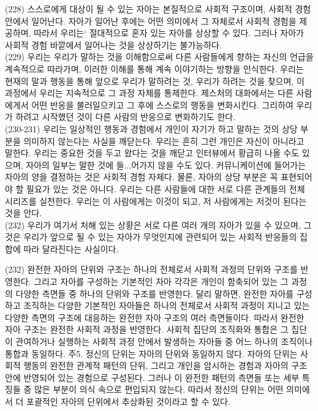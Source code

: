 \documentclass[12pt, a4paper]{article}
\begin{document}
(228) 스스로에게 대상이 될 수 있는 자아는 본질적으로 사회적 구조이며, 사회적 경험 안에서 일어난다. 자아가 일어난 후에는 어떤 의미에서 그 자체로서 사회적 경험을 제공하며, 따라서 우리는` 절대적으로 혼자 있는 자아를 상상할 수 있다. 그러나 자아가 사회적 경험 바깥에서 일어나는 것을 상상하기는 불가능하다. \\

(229) 우리는 우리가 말하는 것을 이해함으로써 다른 사람들에게 향하는 자신의 언급을 계속적으로 따라가며, 이러한 이해를 통해 계속 이야기하는 방향을 인식한다. 우리는 현재의 말과 행동을 통해 앞으로 우리가 말하려는 것, 우리가 하려는 것을 찾으며, 이 과정에서 우리는 지속적으로 그 과정 자체를 통제한다. 제스처의 대화에서는 다른 사람에게서 어떤 반응을 불러일으키고 그 후에 스스로의 행동을 변화시킨다. 그리하여 우리가 하려고 시작했던 것이 다른 사람의 반응으로 변화하기도 한다.  \\

(230-231) 우리는 일상적인 행동과 경험에서 개인이 자기가 하고 말하는 것의 상당 부분을 의미하지 않는다는 사실을 깨닫는다. 우리는 흔히 그런 개인은 자신이 아니라고 말한다. 우리는 중요한 것을 두고 왔다는 것을 깨닫고 인터뷰에서 황급히 나올 수도 있으며, 자아의 일부는 말한 것에 들...어가지 않을 수도 있다. 커뮤니케이션에 들어가는 자아의 양을 결정하는 것은 사회적 경험 자체다. 물론, 자아의 상당 부분은 꼭 표현되어야 할 필요가 있는 것은 아니다. 우리는 다른 사람들에 대한 서로 다른 관계들의 전체 시리즈를 실천한다. 우리는 이 사람에게는 이것이 되고, 저 사람에게는 저것이 된다는 것을 안다. \\

(232) 우리가 여기서 처해 있는 상황은 서로 다른 여러 개의 자아가 있을 수 있으며, 그것은 우리가 앞으로 될 수 있는 자아가 무엇인지에 관련되어 있는 사회적 반응들의 집합에 따라 달라진다는 사실이다. 

(232) 완전한 자아의 단위와 구조는 하나의 전체로서 사회적 과정의 단위와 구조를 반영한다. 그리고 자아를 구성하는 기본적인 자아 각각은 개인이 함축되어 있는 그 과정의 다양한 측면들 중 하나의 단위와 구조를 반영한다. 달리 말하면, 완전한 자아를 구성하고 조직하는 다양한 기본적인 자아들은 하나의 전체로서 사회적 과정이 지니고 있는 다양한 측면의 구조에 대응하는 완전한 자아 구조의 여러 측면들이다. 따라서 완전한 자아 구조는 완전한 사회적 과정을 반영한다. 사회적 집단의 조직화와 통합은 그 집단이 관여하거나 실행하는 사회적 과정 안에서 발생하는 자아들 중 어느 하나의 조직이나 통합과 동일하다. 
주5. 정신의 단위는 자아의 단위와 동일하지 않다. 자아의 단위는 사회적 행동의 완전한 관계적 패턴의 단위, 그리고 개인을 암시하는 경험과 자아의 구조 안에 반영되어 있는 경험으로 구성된다. 그러나 이 완전한 패턴의 측면들 또는 세부 특징들 중 많은 부분이 의식 속으로 편입되지 않는다. 따라서 정신의 단위는 어떤 의미에서 더 포괄적인 자아의 단위에서 추상화된 것이라고 할 수 있다. 
\end{document}
